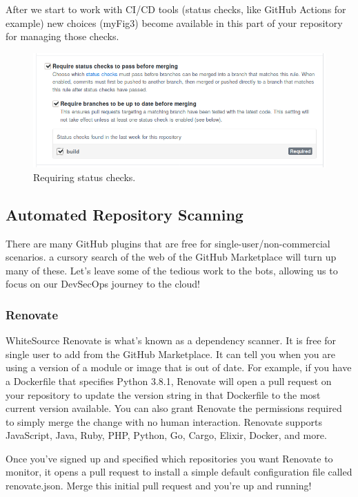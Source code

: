 \justify{}
After we start to work with CI/CD tools (status checks, like GitHub
Actions for example) new choices ({myFig3}) become available in this
part of your repository for managing those checks.

\begin{figure}
      \includegraphics[scale=0.53]{../images/guthub-status-check.png}
      \caption{Requiring status checks.}
      \label{statuscheck}
\end{figure}

\subsection{Automated Repository Scanning}
\justify{}
There are many GitHub plugins that are free for
single-user/non-commercial scenarios. a cursory search of the web of the
GitHub Marketplace will turn up many of these. Let's leave some of the
tedious work to the bots, allowing us to focus on our DevSecOps journey to the cloud!

\subsubsection{Renovate}
\justify{}
WhiteSource Renovate is what's known as a dependency scanner. It is free
for single user to add from the GitHub Marketplace. It can tell you when you are using
a version of a module or image that
is out of date. For example, if you have a Dockerfile that specifies
Python 3.8.1, Renovate will open a pull request on your repository to
update the version string in that Dockerfile to the most current version
available. You can also grant Renovate the permissions required to
simply merge the change with no human interaction. Renovate supports
JavaScript, Java, Ruby, PHP, Python, Go, Cargo, Elixir, Docker, and
more.

\justify{}
Once you've signed up and specified which repositories you want Renovate
to monitor, it opens a pull request to install a simple default
configuration file called renovate.json. Merge this initial pull request
and you're up and running!


